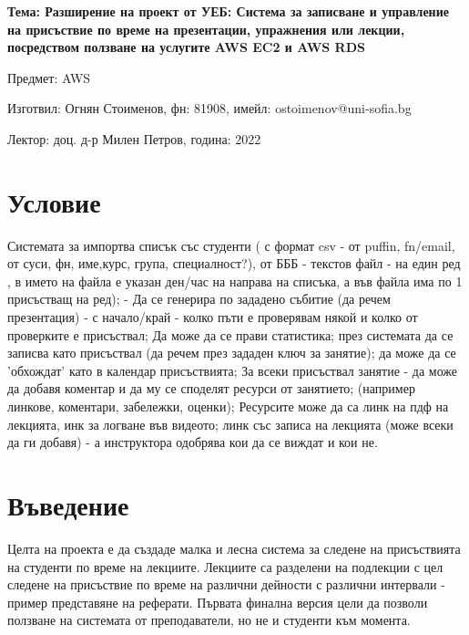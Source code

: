 \documentclass[12pt]{article}
\begin{document}
	\begin{center}
        \LARGE{\textbf{Тема: Разширение на проект от УЕБ: Система за записване и управление на присъствие по време на презентации, упражнения или лекции, посредством ползване на услугите AWS EC2 и AWS RDS}}
        
        \bigskip
        \Large{Предмет: AWS}
        
        \medskip
        \Large{Изготвил: Огнян Стоименов, фн: 81908, имейл: ostoimenov@uni-sofia.bg}
        
        \medskip
        \Large{Лектор: доц. д-р Милен Петров, година: 2022}
        
        \bigskip
	\end{center}
    
    
    \tableofcontents
    \bigskip
    \bigskip
    \newpage
  
\section{Условие} 
Системата за импортва списък със студенти ( с формат csv - от puffin, fn/email, от суси, фн, име,курс, група, специалност?), от БББ - текстов файл - на един ред , в името на файла е указан ден/час на направа на списъка, а във файла има по 1 присъстващ на ред); - Да се генерира по зададено събитие (да речем презентация) - с начало/край - колко пъти е проверявам някой и колко от проверките е присъствал; Да може да се прави статистика; през системата да се записва като присъствал (да речем през зададен ключ за занятие); да може да се 'обхождат' като в календар присъствията; За всеки присъствал занятие - да може да добавя коментар и да му се споделят ресурси от занятието; (например линкове, коментари, забележки, оценки); Ресурсите може да са линк на пдф на лекцията, инк за логване във видеото; линк със записа на лекцията (може всеки да ги добавя) - а инструктора одобрява кои да се виждат и кои не.

\section{Въведение}
Целта на проекта е да създаде малка и лесна система за следене на присъствията на студенти по време на лекциите. Лекциите са разделени на подлекции с цел следене на присъствие по време на различни дейности с различни интервали - пример представяне на реферати. Първата финална версия цели да позволи ползване на системата от преподаватели, но не и студенти към момента. 
\end{document}
